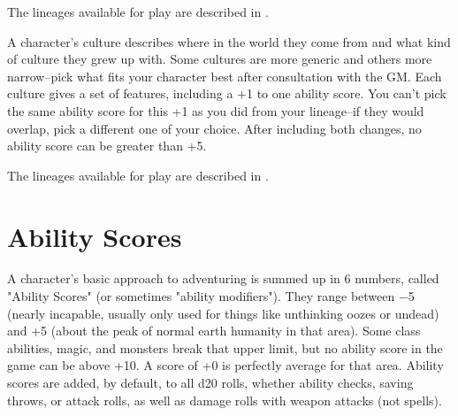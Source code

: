 The lineages available for play are described in .

A character's culture describes where in the world they come from and what kind of culture they grew up with. Some cultures are more generic and others more narrow--pick what fits your character best after consultation with the GM. Each culture gives a set of features, including a +1 to one ability score. You can't pick the same ability score for this +1 as you did from your lineage--if they would overlap, pick a different one of your choice. After including both changes, no ability score can be greater than +5.

The lineages available for play are described in .

\section{Ability Scores}
A character's basic approach to adventuring is summed up in 6 numbers, called "Ability Scores" (or sometimes "ability modifiers"). They range between $-$5 (nearly incapable, usually only used for things like unthinking oozes or undead) and +5 (about the peak of normal earth humanity in that area). Some class abilities, magic, and monsters break that upper limit, but no ability score in the game can be above +10. A score of +0 is perfectly average for that area. Ability scores are added, by default, to all d20 rolls, whether ability checks, saving throws, or attack rolls, as well as damage rolls with weapon attacks (not spells).

